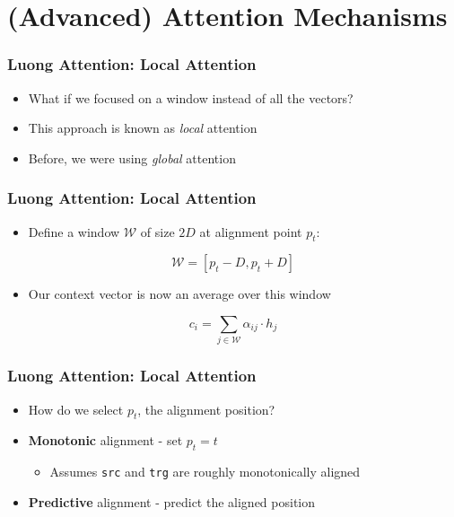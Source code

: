 \documentclass[usenames,dvipsnames]{beamer}
\begin{document}
\section{(Advanced) Attention Mechanisms}

\begin{frame}
  \frametitle{Luong Attention: Local Attention}
  \begin{itemize}
    \item What if we focused on a window instead of all the vectors?
    \item This approach is known as \textit{local} attention
    \item Before, we were using \textit{global} attention
  \end{itemize}
\end{frame}

\begin{frame}
  \frametitle{Luong Attention: Local Attention}
  \begin{itemize}
    \item Define a window $\mathcal{W}$ of size $2D$ at alignment point $p_t$:
  \end{itemize}
  \begin{equation*}
    \mathcal{W} = \left[ p_t - D, p_t + D \right]
  \end{equation*}
  \begin{itemize}
    \item Our context vector is now an average over this window
  \end{itemize}
  \begin{equation*}
    c_i = \sum_{j \in \mathcal{W}} \alpha_{ij} \cdot h_j
  \end{equation*}
\end{frame}

\begin{frame}
  \frametitle{Luong Attention: Local Attention}
  \begin{itemize}
    \item How do we select $p_t$, the alignment position?
    \item \textbf{Monotonic} alignment - set $p_t = t$
    \begin{itemize}
      \item Assumes \texttt{src} and \texttt{trg} are roughly monotonically aligned
    \end{itemize}
    \item \textbf{Predictive} alignment - predict the aligned position
  \end{itemize}
\end{frame}
\end{document}
